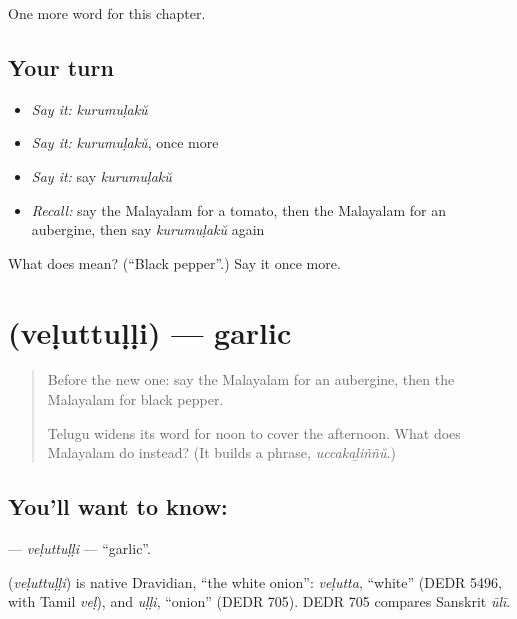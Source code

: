 \begin{grammarlens}[title={What you've built}]
One more word for this chapter.
\end{grammarlens}

\subsection*{Your turn}
\begin{itemize}
\raggedright
  \item \emph{Say it:} \emph{kurumuḷakŭ}
  \item \emph{Say it:} \emph{kurumuḷakŭ}, once more
  \item \emph{Say it:} say \emph{kurumuḷakŭ}
  \item \emph{Recall:} say the Malayalam for a tomato, then the Malayalam for an aubergine, then say \emph{kurumuḷakŭ} again
\end{itemize}

\begin{tcolorbox}[breakable,colback=teal!4,colframe=teal!35!black,title={Before you move on}]
What does  mean? (\textquotedblleft{}Black pepper\textquotedblright{}.) Say it once more.
\end{tcolorbox}
\section[\texorpdfstring{\ml{വെളുത്തുള്ളി} (veḷuttuḷḷi)}{വെളുത്തുള്ളി (veḷuttuḷḷi)}]{ (veḷuttuḷḷi) — garlic}

\label{lesson:ML-C150-veluttulli}



\begin{quote}
Before the new one: say the Malayalam for an aubergine, then the Malayalam for black pepper.

Telugu widens its word for noon to cover the afternoon. What does Malayalam do instead? (It builds a phrase, \emph{uccakaḻiññŭ}.)
\end{quote}

\subsection*{You'll want to know: }
\textbf{} — \emph{veḷuttuḷḷi} — \textquotedblleft{}garlic\textquotedblright{}.

\begin{cousinweb}
\textbf{} (\emph{veḷuttuḷḷi}) is native Dravidian, \textquotedblleft{}the white onion\textquotedblright{}: \emph{veḷutta}, \textquotedblleft{}white\textquotedblright{} (DEDR 5496, with Tamil \emph{veḷ}), and \emph{uḷḷi}, \textquotedblleft{}onion\textquotedblright{} (DEDR 705). DEDR 705 compares Sanskrit \emph{ūlī}.
\end{cousinweb}


